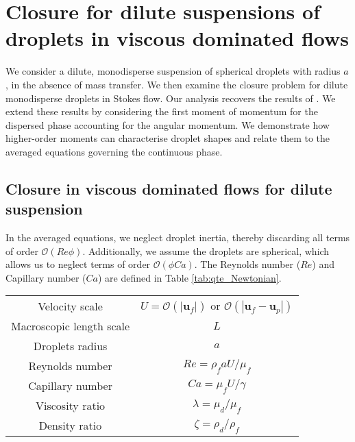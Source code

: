 \section{Closure for dilute suspensions of droplets in viscous dominated flows}
We consider a dilute, monodisperse suspension of spherical droplets with radius \( a \), in the absence of mass transfer. 
We then examine the closure problem for dilute monodisperse droplets in Stokes flow. 
Our analysis recovers the results of \citet[Appendix B]{zhang1997momentum}. 
We extend these results by considering the first moment of momentum for the dispersed phase accounting for the angular momentum. 
We demonstrate how higher-order moments can characterise droplet shapes and relate them to the averaged equations governing the continuous phase. 
\subsection{Closure in viscous dominated flows for dilute suspension}
In the averaged equations, we neglect droplet inertia, thereby discarding all terms of order $\mathcal{O}(Re \phi)$. 
Additionally, we assume the droplets are spherical, which allows us to neglect terms of order $\mathcal{O}(\phi Ca)$. 
The Reynolds number ($Re$) and Capillary number ($Ca$) are defined in Table \ref{tab:qte_Newtonian}.
\begin{table}
\begin{tabular}{|c|c|}\hline\hline
    Velocity scale & $U = \mathcal{O}(|\textbf{u}_f|)$ or $\mathcal{O}(|\textbf{u}_f - \textbf{u}_p|)$ \\
    Macroscopic length scale & $L$ \\
    Droplets radius & $a$ \\
    Reynolds number & $Re = \rho_f a U / \mu_f$   \\
Capillary number & $Ca = \mu_f U / \gamma$ \\\hline
Viscosity ratio & $\lambda = \mu_d / \mu_f$ \\
Density ratio & $\zeta = \rho_d / \rho_f$ \\
    \end{tabular}
\end{table}

